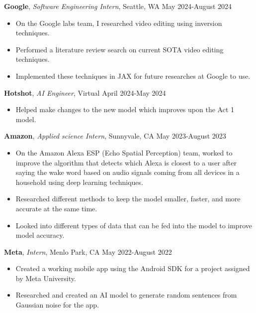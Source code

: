 \documentclass[a4paper,10pt]{article}
\begin{document}
\noindent\textbf{Google}, \textit{Software Engineering Intern}, Seattle, WA \hfill May 2024-August 2024
\begin{itemize}[noitemsep,topsep=0pt]
  \item On the Google labs team, I researched video editing using inversion techniques.
  \item Performed a literature review search on current SOTA video editing techniques.
  \item Implemented these techniques in JAX for future researches at Google to use.
\end{itemize}

\noindent\textbf{Hotshot}, \textit{AI Engineer}, Virtual \hfill April 2024-May 2024
\begin{itemize}[noitemsep,topsep=0pt]
  \item Helped make changes to the new model which improves upon the Act 1 model.
\end{itemize}

\noindent\textbf{Amazon}, \textit{Applied science Intern}, Sunnyvale, CA \hfill May 2023-August 2023
\begin{itemize}[noitemsep,topsep=0pt]
  \item On the Amazon Alexa ESP (Echo Spatial Perception) team, worked to improve the algorithm that detects which Alexa is closest to a user after saying the wake word based on audio signals coming from all devices in a household using deep learning techniques.
  \item Researched different methods to keep the model smaller, faster, and more accurate at the same time.
  \item Looked into different types of data that can be fed into the model to improve model accuracy.
\end{itemize}

\noindent\textbf{Meta}, \textit{Intern}, Menlo Park, CA \hfill May 2022-August 2022
\begin{itemize}[noitemsep,topsep=0pt]
  \item Created a working mobile app using the Android SDK for a project assigned by Meta University.
  \item Researched and created an AI model to generate random sentences from Gaussian noise for the app.
\end{itemize}
\end{document}
